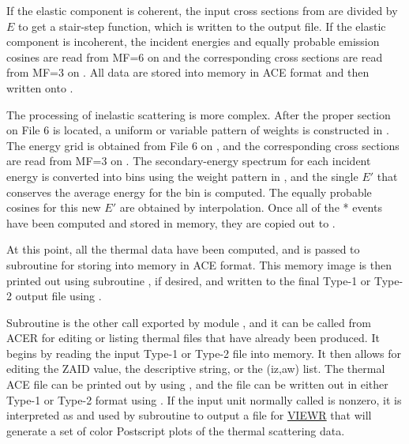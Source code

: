If the elastic component is coherent, the input cross sections
from  are divided by $E$ to get a stair-step function,
which is written to the output file.  If the elastic component is
incoherent, the incident energies and equally probable emission
cosines are read from MF=6 on  and the corresponding
cross sections are read from MF=3 on .  All data are
stored into memory in ACE format and then written onto .

The processing of inelastic scattering is more complex.  After the
proper section on File 6 is located, a uniform or variable pattern
of weights is constructed in .  The energy grid is
obtained from File 6 on , and the corresponding cross
sections are read from MF=3 on .  The secondary-energy
spectrum for each incident energy is converted into bins using the
weight pattern in , and the single $E'$ that conserves
the average energy for the bin is computed.  The  equally
probable cosines for this new $E'$ are obtained by interpolation.
Once all of the * events have been computed and
stored in memory, they are copied out to .

At this point, all the thermal data have been computed, and 
is passed to subroutine 
for storing into memory in ACE format.  This memory image is then
printed out using subroutine ,
if desired, and written to the final Type-1 or Type-2 output file using
.

Subroutine 
is the other call exported by module
, and it
can be called from ACER for editing or listing
thermal files that have already been produced.  It begins by reading
the input Type-1 or Type-2 file into memory.  It then allows
for editing the ZAID value, the descriptive string, or the (iz,aw) list.
The thermal ACE file can be printed out by using , and
the file can be written out in either Type-1 or Type-2 format using
.  If the input unit normally called 
is nonzero, it is interpreted as  and used by subroutine
 to output a file for
\hyperlink{sVIEWRhy}{VIEWR} that will generate a
set of color Postscript plots of the thermal scattering data.

